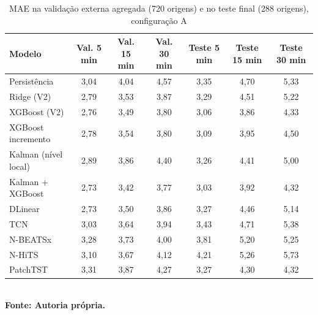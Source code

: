 \begin{table}[htb]
\caption{MAE na validação externa agregada (720 origens) e no teste final (288 origens), configuração A}
\label{tab:v3-validacao-teste}
\centering
\footnotesize
\setlength{\tabcolsep}{3pt}
\renewcommand{\arraystretch}{1.15}
\begin{tabular}{|l|c|c|c|c|c|c|}
\hline
\textbf{Modelo} & \textbf{Val. 5 min} & \textbf{Val. 15 min} & \textbf{Val. 30 min} & \textbf{Teste 5 min} & \textbf{Teste 15 min} & \textbf{Teste 30 min} \\
\hline
Persistência & 3{,}04 & 4{,}04 & 4{,}57 & 3{,}35 & 4{,}70 & 5{,}33 \\
Ridge (V2) & 2{,}79 & 3{,}53 & 3{,}87 & 3{,}29 & 4{,}51 & 5{,}22 \\
XGBoost (V2) & 2{,}76 & 3{,}49 & 3{,}80 & 3{,}06 & 3{,}86 & 4{,}33 \\
XGBoost incremento & 2{,}78 & 3{,}54 & 3{,}80 & 3{,}09 & 3{,}95 & 4{,}50 \\
Kalman (nível local) & 2{,}89 & 3{,}86 & 4{,}40 & 3{,}26 & 4{,}41 & 5{,}00 \\
Kalman + XGBoost & 2{,}73 & 3{,}42 & 3{,}77 & 3{,}03 & 3{,}92 & 4{,}32 \\
DLinear & 2{,}73 & 3{,}50 & 3{,}86 & 3{,}27 & 4{,}46 & 5{,}14 \\
TCN & 3{,}03 & 3{,}64 & 3{,}94 & 3{,}43 & 4{,}71 & 5{,}38 \\
N-BEATSx & 3{,}28 & 3{,}73 & 4{,}00 & 3{,}81 & 5{,}20 & 5{,}25 \\
N-HiTS & 3{,}10 & 3{,}67 & 4{,}12 & 4{,}21 & 5{,}26 & 5{,}73 \\
PatchTST & 3{,}31 & 3{,}87 & 4{,}27 & 3{,}27 & 4{,}30 & 4{,}32 \\
\hline
\end{tabular}\\
\textbf{\footnotesize Fonte: Autoria própria.}
\end{table}
